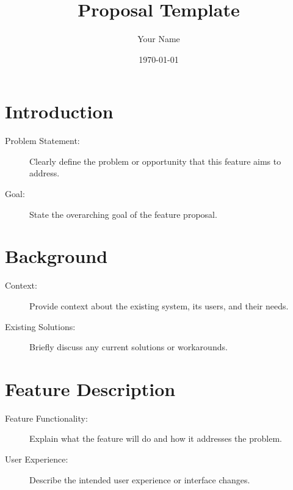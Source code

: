 \documentclass{article}
\title{Proposal Template}
\author{Your Name}
\date{\today} %
\begin{document}
\maketitle

\section{Introduction}
\begin{description}
    \item[Problem Statement:] Clearly define the problem or opportunity that this feature aims to address.
    \item[Goal:] State the overarching goal of the feature proposal.
\end{description}

\section{Background}
\begin{description}
    \item[Context:] Provide context about the existing system, its users, and their needs.
    \item[Existing Solutions:] Briefly discuss any current solutions or workarounds.
\end{description}

\section{Feature Description}
\begin{description}
    \item[Feature Functionality:] Explain what the feature will do and how it addresses the problem.
    \item[User Experience:] Describe the intended user experience or interface changes.
\end{description}
\end{document}
